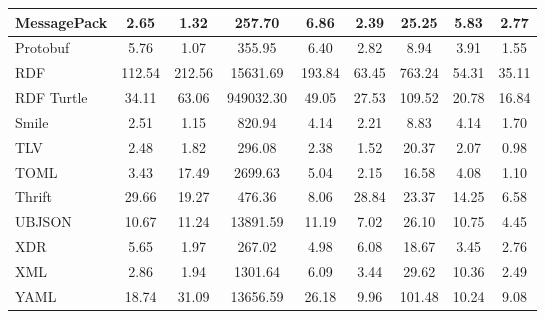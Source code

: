 \documentclass[10pt]{IEEEtran}
\begin{document}
{\begin{table*}[t]
\begin{tabular}{|p{21mm}|c|c|c|c|c|c|c|c|}
    MessagePack & 2.65 & 1.32 & 257.70 & 6.86 & 2.39 & 25.25 & 5.83 & 2.77 \\ \hline
    Protobuf & 5.76 & 1.07 & 355.95 & 6.40 & 2.82 & 8.94 & 3.91 & 1.55 \\ \hline
    RDF & 112.54 & 212.56 & 15631.69 & 193.84 & 63.45 & 763.24 & 54.31 & 35.11 \\ \hline
    RDF Turtle & 34.11 & 63.06 & 949032.30 & 49.05 & 27.53 & 109.52 & 20.78 & 16.84 \\ \hline
    Smile & 2.51 & 1.15 & 820.94 & 4.14 & 2.21 & 8.83 & 4.14 & 1.70 \\ \hline
    TLV & 2.48 & 1.82 & 296.08 & 2.38 & 1.52 & 20.37 & 2.07 & 0.98 \\ \hline
    TOML & 3.43 & 17.49 & 2699.63 & 5.04 & 2.15 & 16.58 & 4.08 & 1.10 \\ \hline
    Thrift & 29.66 & 19.27 & 476.36 & 8.06 & 28.84 & 23.37 & 14.25 & 6.58 \\ \hline
    UBJSON & 10.67 & 11.24 & 13891.59 & 11.19 & 7.02 & 26.10 & 10.75 & 4.45 \\ \hline
    XDR & 5.65 & 1.97 & 267.02 & 4.98 & 6.08 & 18.67 & 3.45 & 2.76 \\ \hline
    XML & 2.86 & 1.94 & 1301.64 & 6.09 & 3.44 & 29.62 & 10.36 & 2.49 \\ \hline
    YAML & 18.74 & 31.09 & 13656.59 & 26.18 & 9.96 & 101.48 & 10.24 & 9.08 \\ \hline
    \end{tabular}
\end{table*}}


 


\end{document}
